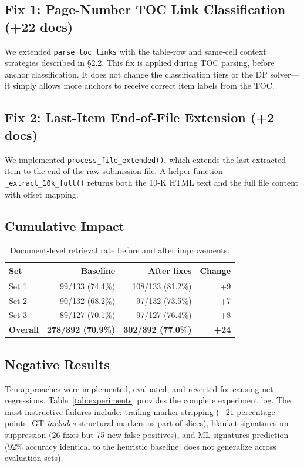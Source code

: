 \documentclass[11pt,a4paper]{article}
\begin{document}
\subsection{Fix 1: Page-Number TOC Link Classification (+22 docs)}

We extended \texttt{parse\_toc\_links} with the table-row and same-cell context strategies described in \S2.2. This fix is applied during TOC parsing, before anchor classification. It does not change the classification tiers or the DP solver---it simply allows more anchors to receive correct item labels from the TOC.

\subsection{Fix 2: Last-Item End-of-File Extension (+2 docs)}

We implemented \texttt{process\_file\_extended()}, which extends the last extracted item to the end of the raw submission file. A helper function \texttt{\_extract\_10k\_full()} returns both the 10-K HTML text and the full file content with offset mapping.

\subsection{Cumulative Impact}

\begin{table}[H]
\centering
\caption{Document-level retrieval rate before and after improvements.}
\begin{tabular}{lrrr}
\toprule
\textbf{Set} & \textbf{Baseline} & \textbf{After fixes} & \textbf{Change}\\
\midrule
Set 1 & 99/133 (74.4\%) & 108/133 (81.2\%) & +9\\
Set 2 & 90/132 (68.2\%) & 97/132 (73.5\%) & +7\\
Set 3 & 89/127 (70.1\%) & 97/127 (76.4\%) & +8\\
\midrule
\textbf{Overall} & \textbf{278/392 (70.9\%)} & \textbf{302/392 (77.0\%)} & \textbf{+24}\\
\bottomrule
\end{tabular}
\end{table}

\subsection{Negative Results}

Ten approaches were implemented, evaluated, and reverted for causing net regressions. Table~\ref{tab:experiments} provides the complete experiment log. The most instructive failures include: trailing marker stripping ($-21$ percentage points; GT \emph{includes} structural markers as part of slices), blanket signatures un-suppression (26 fixes but 75 new false positives), and ML signatures prediction (92\% accuracy identical to the heuristic baseline; does not generalize across evaluation sets).
\end{document}
